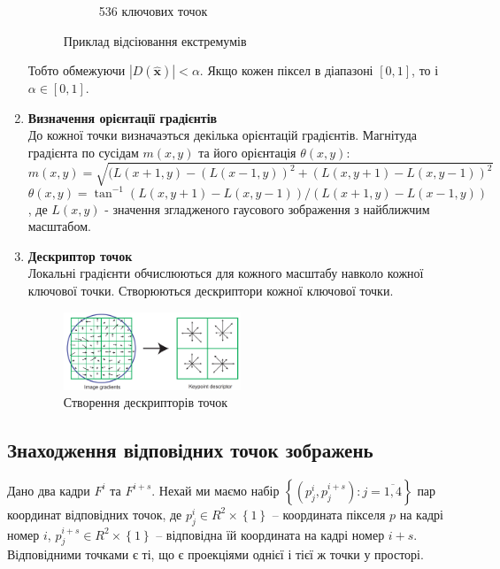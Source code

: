 \begin{enumerate}
\begin{figure}[H]
\begin{subfigure}[c]{0.3\textwidth}
                  \caption{ 536 ключових точок
                      \label{fig:swift5}
                  }
              \end{subfigure}
              \caption{Приклад відсіювання екстремумів
                  \label{fig:sift45}
              }
          \end{figure}
          Тобто обмежуючи $|D(\widehat{\textbf{x}})| < \alpha$. Якщо кожен піксел в діапазоні $[0,1]$, то і
          $ \alpha \in [0,1]$.
    \item \textbf{Визначення орієнтації градієнтів} \\
          До кожної точки визначаэться декілька орієнтацій градієнтів.
          Магнітуда градієнта по сусідам $m(x,y)$ та його орієнтація $\theta(x,y)$:
          \begin{equation}
              m(x,y) = \sqrt{(L(x+1,y) - (L(x-1,y))^2 + (L(x,y+1) - L(x,y-1))^2}
          \end{equation}
          \begin{equation}
              \theta(x,y) = \tan^{-1} (L(x,y+1) - L(x,y-1))/(L(x+1,y) - L(x-1,y))
          \end{equation}
          , де $L(x,y)$ - значення згладженого гаусового зображення з найближчим масштабом.

    \item \textbf{Дескриптор точок} \\
          Локальні градієнти обчислюються для кожного масштабу навколо кожної ключової точки.
          Створюються дескриптори кожної ключової точки.
          \begin{figure}[H]
              \centering
              \includegraphics[width=0.5\textwidth]{images/sift6}
              \caption{Створення дескрипторів точок}
              \label{fig:swift6}
          \end{figure}
\end{enumerate}

\subsection{Знаходження відповідних точок зображень}

Дано два кадри \(F^{i}\) та \(F^{i + s}\). Нехай ми маємо набір
\(\left\{ \left( p_{j}^{i},p_{j}^{i + s} \right):j = \overline{1,4} \right\}\)
пар координат відповідних точок, де
\(p_{j}^{i} \in R^{2} \times \left\{ 1 \right\}\) -- координата пікселя
\(p\) на кадрі номер \(i\),
\(p_{j}^{i + s} \in R^{2} \times \left\{ 1 \right\}\) -- відповідна їй
координата на кадрі номер \(i + s\). Відповідними точками є ті, що є
проекціями однієї і тієї ж точки у просторі.


